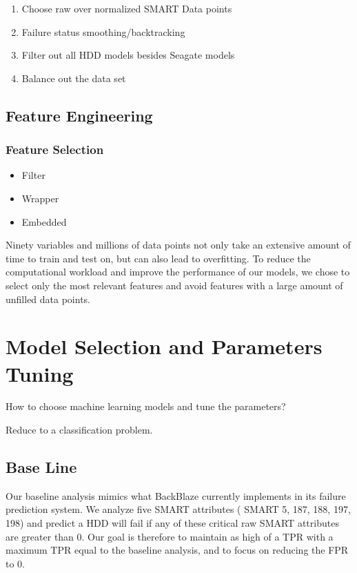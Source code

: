 \documentclass[12pt,a4paper,english]{amsart}
\begin{document}
\begin{enumerate}
	\item Choose raw over normalized SMART Data points
	\item Failure status smoothing/backtracking
	\item Filter out all HDD models besides Seagate models
	\item Balance out the data set
\end{enumerate}

\subsection{Feature Engineering}

\subsubsection*{Feature Selection}

\begin{itemize}
	\item Filter
	\item Wrapper
	\item Embedded
\end{itemize}

Ninety variables and millions of data points not only take an extensive amount of time to train and test on, but can also lead to overfitting. To reduce the computational workload and improve the performance of our models, we chose   to   select   only   the   most   relevant   features   and   avoid   features   with   a   large   amount   of   unfilled   data   points.
%
\section{Model Selection and Parameters Tuning}

How to choose machine learning models and tune the parameters?

Reduce to a classification problem.

\subsection*{Base Line}

Our baseline analysis mimics what BackBlaze currently implements in its failure prediction system. We analyze five SMART attributes ( SMART 5, 187, 188, 197, 198) and predict a HDD will fail if any of these critical raw SMART   attributes   are   greater   than   0.
Our goal is therefore to maintain as high of a TPR with a maximum TPR equal to the baseline analysis, and to focus   on   reducing   the   FPR   to   0.
\end{document}
